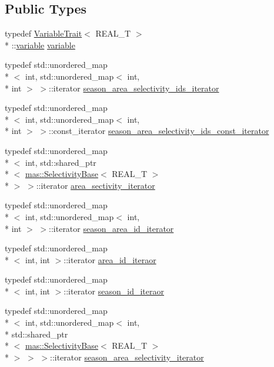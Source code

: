 \subsection*{Public Types}
\begin{DoxyCompactItemize}
\item 
typedef \hyperlink{structmas_1_1_variable_trait}{Variable\-Trait}$<$ R\-E\-A\-L\-\_\-\-T $>$\\*
\-::\hyperlink{structmas_1_1_survey_ae91896013e1a3403f7e3d79b1f845966}{variable} \hyperlink{structmas_1_1_survey_ae91896013e1a3403f7e3d79b1f845966}{variable}
\item 
typedef std\-::unordered\-\_\-map\\*
$<$ int, std\-::unordered\-\_\-map$<$ int, \\*
int $>$ $>$\-::iterator \hyperlink{structmas_1_1_survey_a93b422e50a88d61d2bf59e5cf8895295}{season\-\_\-area\-\_\-selectivity\-\_\-ids\-\_\-iterator}
\item 
typedef std\-::unordered\-\_\-map\\*
$<$ int, std\-::unordered\-\_\-map$<$ int, \\*
int $>$ $>$\-::const\-\_\-iterator \hyperlink{structmas_1_1_survey_af8b1532c87b7b6cce73d17472d03eb5a}{season\-\_\-area\-\_\-selectivity\-\_\-ids\-\_\-const\-\_\-iterator}
\item 
typedef std\-::unordered\-\_\-map\\*
$<$ int, std\-::shared\-\_\-ptr\\*
$<$ \hyperlink{structmas_1_1_selectivity_base}{mas\-::\-Selectivity\-Base}$<$ R\-E\-A\-L\-\_\-\-T $>$\\*
 $>$ $>$\-::iterator \hyperlink{structmas_1_1_survey_abfde314e73f8c92d58d75373fc805ee3}{area\-\_\-sectivity\-\_\-iterator}
\item 
typedef std\-::unordered\-\_\-map\\*
$<$ int, std\-::unordered\-\_\-map$<$ int, \\*
int $>$ $>$\-::iterator \hyperlink{structmas_1_1_survey_aabb40313de7f308ef66d028b839984ca}{season\-\_\-area\-\_\-id\-\_\-iterator}
\item 
typedef std\-::unordered\-\_\-map\\*
$<$ int, int $>$\-::iterator \hyperlink{structmas_1_1_survey_a08455055f86587e069b3ea5266ef0822}{area\-\_\-id\-\_\-iteraor}
\item 
typedef std\-::unordered\-\_\-map\\*
$<$ int, int $>$\-::iterator \hyperlink{structmas_1_1_survey_a609a3e09a088bcc4f5bed6fdb565566e}{season\-\_\-id\-\_\-iteraor}
\item 
typedef std\-::unordered\-\_\-map\\*
$<$ int, std\-::unordered\-\_\-map$<$ int, \\*
std\-::shared\-\_\-ptr\\*
$<$ \hyperlink{structmas_1_1_selectivity_base}{mas\-::\-Selectivity\-Base}$<$ R\-E\-A\-L\-\_\-\-T $>$\\*
 $>$ $>$ $>$\-::iterator \hyperlink{structmas_1_1_survey_a75fb76cac18f90a25965ce77bdb6b429}{season\-\_\-area\-\_\-selectivity\-\_\-iterator}
\end{DoxyCompactItemize}
